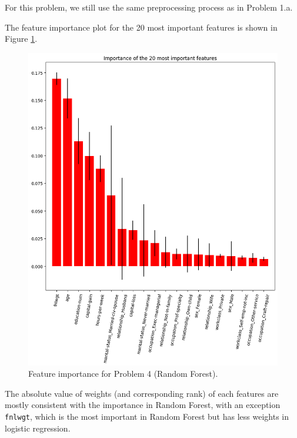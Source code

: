\documentclass{article}%
\begin{document}
\begin{enumerate}
For this problem, we still use the same preprocessing process as in Problem 1.a. 

The feature importance plot for the 20 most important features is shown in Figure \ref{problem4-importance}.

\begin{figure}[htbp]
\centering
\includegraphics[scale=0.5]{problem4_importance.png}
\caption{Feature importance for Problem 4 (Random Forest).}
\label{problem4-importance}
\end{figure}

The absolute value of weights (and corresponding rank) of each features are mostly consistent with the importance in Random Forest, with an exception \texttt{fnlwgt}, which is the most important in Random Forest but has less weights in logistic regression. 

\end{enumerate}
\end{document}
